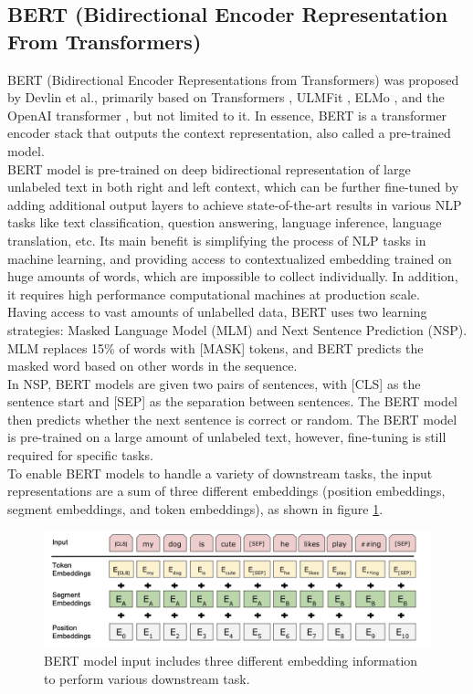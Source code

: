 \documentclass[%
	BCOR=8mm, %
	DIV=12,
	toc=bibliography, %
	toc=listof, %
	oneside, %
	egregdoesnotlikesansseriftitles, %
	]{scrbook}
\begin{document}
\subsection{BERT (Bidirectional Encoder Representation From Transformers)}
BERT (Bidirectional Encoder Representations from Transformers) was proposed by Devlin et al.\cite{devlin_bert_2019-1}, primarily based on Transformers \cite{vaswani_attention_2017}, ULMFit \cite{howard_universal_2018}, ELMo \cite{peters_deep_2018-3}, and the OpenAI transformer \cite{radford_improving_nodate}, but not limited to it. In essence, BERT is a transformer encoder stack that outputs the context representation, also called a pre-trained model. \\
BERT model is pre-trained on deep bidirectional representation of large unlabeled text in both right and left context, which can be further fine-tuned by adding additional output layers to achieve state-of-the-art results in various NLP tasks like text classification, question answering, language inference, language translation, etc. Its main benefit is simplifying the process of NLP tasks in machine learning, and providing access to contextualized embedding trained on huge amounts of words, which are impossible to collect individually. In addition, it requires high performance computational machines at production scale. \\
Having access to vast amounts of unlabelled data,  BERT uses two learning strategies: Masked Language Model (MLM) and Next Sentence Prediction (NSP). MLM replaces 15\% of words with [MASK] tokens, and BERT predicts the masked word based on other words in the sequence.\\
In NSP, BERT models are given two pairs of sentences, with [CLS] as the sentence start and [SEP] as the separation between sentences. The BERT model then predicts whether the next sentence is correct or random. The BERT model is pre-trained on a large amount of unlabeled text, however, fine-tuning is still required for specific tasks.\\
To enable BERT models to handle a variety of downstream tasks, the input representations are a sum of three different embeddings (position embeddings, segment embeddings, and token embeddings), as shown in figure \ref{fig:bert_inp}.
\begin{figure}[H]
    \centering
    \includegraphics[width=0.6\linewidth]{img/bert_inp.png}
    \caption[Three different embeddings in BERT model]{\small BERT model input includes three different embedding information to perform various downstream task\cite{devlin_bert_2019-1}. }
    \label{fig:bert_inp}
\end{figure}
\end{document}
